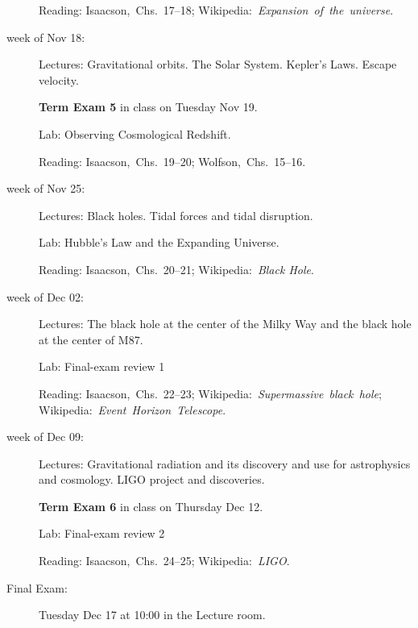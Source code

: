 \documentclass[12pt]{article}
\begin{document}
\begin{description}
  Reading: Isaacson,~Chs.~17--18;
  Wikipedia:~\textit{Expansion~of~the~universe}.

\item[week of Nov 18:] Lectures: Gravitational orbits. The Solar
  System. Kepler's Laws. Escape velocity.

  \textbf{Term Exam 5} in class on Tuesday Nov 19.

  Lab: Observing Cosmological Redshift.

  Reading: Isaacson,~Chs.~19--20;
           Wolfson,~Chs.~15--16.

\item[week of Nov 25:] Lectures: Black holes. Tidal forces and tidal
  disruption.

  Lab: Hubble's Law and the Expanding Universe.

  Reading: Isaacson,~Chs.~20--21;
  Wikipedia:~\textit{Black Hole}.

\item[week of Dec 02:] Lectures: The black hole at the center of the
  Milky Way and the black hole at the center of M87.

  Lab: Final-exam review 1

  Reading: Isaacson,~Chs.~22--23;
  Wikipedia:~\textit{Supermassive~black~hole};
  Wikipedia:~\textit{Event~Horizon~Telescope}.

\item[week of Dec 09:] Lectures: Gravitational radiation and its
  discovery and use for astrophysics and cosmology. LIGO project and
  discoveries.

  \textbf{Term Exam 6} in class on Thursday Dec 12.

  Lab: Final-exam review 2

  Reading: Isaacson,~Chs.~24--25;
  Wikipedia:~\textit{LIGO}.

\item[Final Exam:] Tuesday Dec 17 at 10:00 in the Lecture room.
\end{description}
\end{document}
